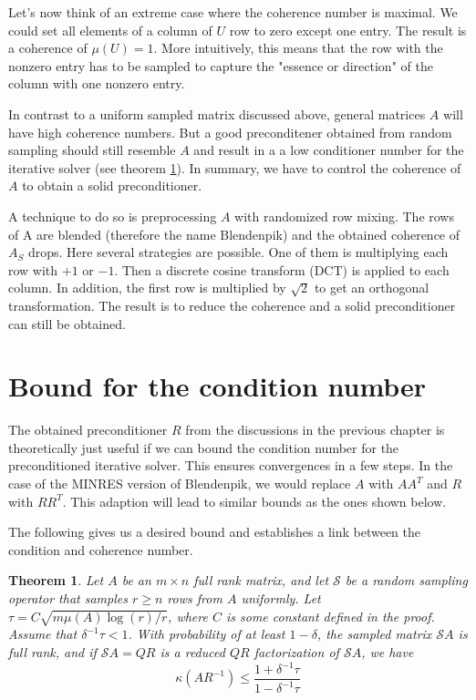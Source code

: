 \documentclass{article}
\newtheorem{theorem}{Theorem}
\begin{document}
\bigskip

Let's now think of an extreme case where the coherence number is maximal. We
could set all elements of a column of $U$ row to zero except one entry. The
result is a coherence of $\mu(U)=1$. More intuitively, this means that the row with
the nonzero entry has to be sampled to capture the "essence or direction" of
the column with one nonzero entry.

In contrast to a uniform sampled matrix discussed above, general matrices $A$
will have high coherence numbers. But a good preconditener obtained from random sampling
should still resemble $A$ and result in a a low conditioner number for the iterative
solver (see theorem \ref{thm_1}). In summary, we have to control the coherence of $A$ to
obtain a solid preconditioner.

A technique to do so is preprocessing $A$ with randomized row mixing. The rows
of A are blended (therefore the name Blendenpik) and the obtained coherence of
$A_S$ drops. Here several strategies are possible. One of them is multiplying
each row with $+1$ or $-1$. Then a discrete cosine transform (DCT) is applied
to each column. In addition, the first row is multiplied by $\sqrt{2}$ to get
an orthogonal transformation. The result is to reduce the coherence and a solid
preconditioner can still be obtained.


\section{Bound for the condition number} \label{bound}
The obtained preconditioner $R$ from
the discussions in the previous chapter is theoretically just useful if we can
bound the condition number for the preconditioned iterative solver. This
ensures convergences in a few steps. In the case of the MINRES version of
Blendenpik, we would replace $A$ with $AA^T$ and $R$ with $RR^T$. This adaption
will lead to similar bounds as the ones shown below.

The following gives us a desired bound and establishes a link between the
condition and coherence number.

\begin{theorem} \label{thm_1}
Let $A$ be an $m \times n$ full rank matrix, and let $\mathcal{S}$ be a random
sampling operator that samples $r \geq n$ rows from $A$ uniformly. Let $\tau=C
\sqrt{m \mu(A) \log (r) / r}$, where $C$ is some constant defined in the proof.
Assume that $\delta^{-1} \tau<1$. With probability of at least $1-\delta$, the
sampled matrix $\mathcal{S} A$ is full rank, and if $\mathcal{S} A=Q R$ is a
reduced $Q R$ factorization of $\mathcal{S} A$, we have
$$
\kappa\left(A R^{-1}\right) \leq \frac{1+\delta^{-1} \tau}{1-\delta^{-1} \tau}
$$
\end{theorem}
\end{document}
